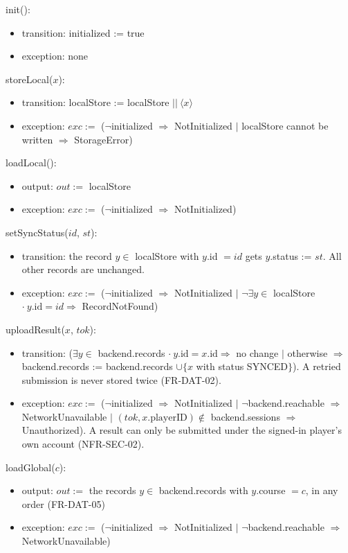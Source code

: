 \documentclass[12pt, titlepage]{article}
\newcommand{\True}{\textnormal{true}}
\newcommand{\noinit}{$\neg$initialized $\Rightarrow$ NotInitialized}
\begin{document}
\noindent init():
\begin{itemize}
\item transition: initialized := \True
\item exception: none
\end{itemize}

\noindent storeLocal($x$):
\begin{itemize}
\item transition: localStore := localStore $||\ \langle x \rangle$
\item exception: $exc :=$ (\noinit{} $|$ localStore cannot be written
  $\Rightarrow$ StorageError)
\end{itemize}

\noindent loadLocal():
\begin{itemize}
\item output: $out :=$ localStore
\item exception: $exc :=$ (\noinit)
\end{itemize}

\noindent setSyncStatus($id$, $st$):
\begin{itemize}
\item transition: the record $y \in$ localStore with $y$.id $= id$ gets
  $y$.status := $st$. All other records are unchanged.
\item exception: $exc :=$ (\noinit{} $|$ $\neg\exists y \in$ localStore
  $\cdot\ y.\text{id} = id \Rightarrow$ RecordNotFound)
\end{itemize}

\noindent uploadResult($x$, $tok$):
\begin{itemize}
\item transition: ($\exists y \in$ backend.records $\cdot\ y.\text{id} =
  x.\text{id} \Rightarrow$ no change $|$ otherwise $\Rightarrow$
  backend.records := backend.records $\cup \{x$ with status SYNCED$\}$). A
  retried submission is never stored twice (FR-DAT-02).
\item exception: $exc :=$ (\noinit{} $|$ $\neg$backend.reachable
  $\Rightarrow$ NetworkUnavailable $|$ $(tok, x.\text{playerID}) \notin$
  backend.sessions $\Rightarrow$ Unauthorized). A result can only be submitted
  under the signed-in player's own account (NFR-SEC-02).
\end{itemize}

\noindent loadGlobal($c$):
\begin{itemize}
\item output: $out :=$ the records $y \in$ backend.records with $y$.course
  $= c$, in any order (FR-DAT-05)
\item exception: $exc :=$ (\noinit{} $|$ $\neg$backend.reachable
  $\Rightarrow$ NetworkUnavailable)
\end{itemize}
\end{document}

